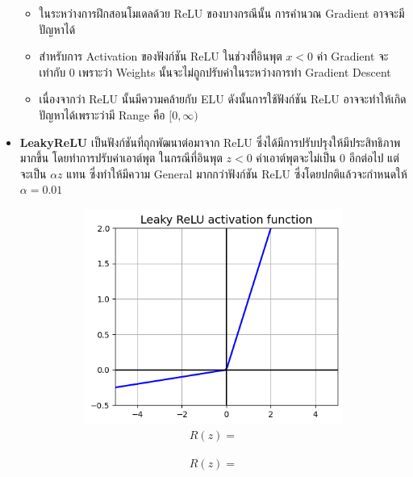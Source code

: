 \begin{itemize}
\begin{itemize}
              \item ในระหว่างการฝึกสอนโมเดลด้วย ReLU ของบางกรณีนั้น การคำนวณ Gradient อาจจะมีปัญหาได้

              \item สำหรับการ Activation ของฟังก์ชัน ReLU ในช่วงที่ิอินพุต $x < 0$ ค่า Gradient จะเท่ากับ 0 เพราะว่า Weights
                    นั้นจะไม่ถูกปรับค่าในระหว่างการทำ Gradient Descent

              \item เนื่องจากว่า ReLU นั้นมีความคล้ายกับ ELU ดังนั้นการใช้ฟังก์ชัน ReLU อาจจะทำให้เกิดปัญหาได้เพราะว่ามี Range คือ
                    $[0,\infty)$
          \end{itemize}

    \item \textbf{LeakyReLU}\autocite{he2015} เป็นฟังก์ชันที่ถุกพัฒนาต่อมาจาก ReLU ซึ่งได้มีการปรับปรุงให้มีประสิทธิภาพมากขึ้น%
          โดยทำการปรับค่าเอาต์พุต ในกรณีที่อินพุต $z < 0$ ค่าเอาต์พุตจะไม่เป็น 0 อีกต่อไป แต่จะเป็น $\alpha z$ แทน ซึ่งทำให้มีความ General
          มากกว่าฟังก์ชัน ReLU ซึ่งโดยปกติแล้วจะกำหนดให้ $\alpha = 0.01$
          \begin{figure}[H]
              \centering
              \begin{subfigure}{0.5\textwidth}
                  \centering
                  \includegraphics[width=0.9\linewidth]{fig/actfunc_leakyrelu.png}
                  \caption{%
                      \begin{equation}
                          \begin{split}R(z) =

\end{split}
\end{equation}}
\end{subfigure}
\end{figure}
\end{itemize}
